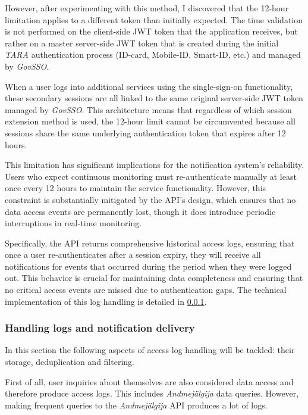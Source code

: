 However, after experimenting with this method, I discovered that the 12-hour limitation applies to a different token than initially expected. The time validation is not performed on the client-side JWT token that the application receives, but rather on a master server-side JWT token that is created during the initial \textit{TARA} authentication process (ID-card, Mobile-ID, Smart-ID, etc.) and managed by \textit{GovSSO}.

When a user logs into additional services using the single-sign-on functionality, these secondary sessions are all linked to the same original server-side JWT token managed by \textit{GovSSO}. This architecture means that regardless of which session extension method is used, the 12-hour limit cannot be circumvented because all sessions share the same underlying authentication token that expires after 12 hours.

This limitation has significant implications for the notification system's reliability. Users who expect continuous monitoring must re-authenticate manually at least once every 12 hours to maintain the service functionality. However, this constraint is substantially mitigated by the API's design, which ensures that no data access events are permanently lost, though it does introduce periodic interruptions in real-time monitoring.

Specifically, the API returns comprehensive historical access logs, ensuring that once a user re-authenticates after a session expiry, they will receive all notifications for events that occurred during the period when they were logged out. This behavior is crucial for maintaining data completeness and ensuring that no critical access events are missed due to authentication gaps. The technical implementation of this log handling is detailed in \ref{log-handling}.

\subsubsection{Handling logs and notification delivery}
\label{log-handling}
In this section the following aspects of access log handling will be tackled: their storage, deduplication and filtering.

First of all, user inquiries about themselves are also considered data access and therefore produce access logs. This includes \textit{Andmejälgija} data queries. However, making frequent queries to the \textit{Andmejälgija} API produces a lot of logs. 

